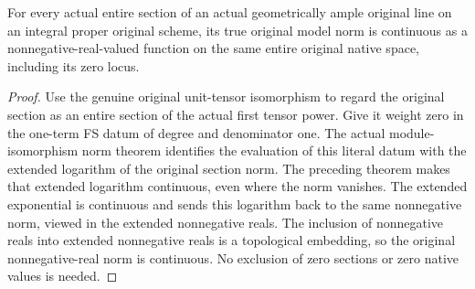 \begin{theorem}
\label{thm:native-ample-line-global-section-norm-continuous}
\leanok
{}
For every actual entire section of an actual geometrically ample original
line on an integral proper original scheme, its true original model norm
is continuous as a nonnegative-real-valued function on the same entire
original native space, including its zero locus.
\end{theorem}
\begin{proof}
Use the genuine original unit-tensor isomorphism to regard the original
section as an entire section of the actual first tensor power. Give it
weight zero in the one-term FS datum of degree and denominator one.
The actual module-isomorphism norm theorem identifies the evaluation of
this literal datum with the extended logarithm of the original section
norm. The preceding theorem makes that extended logarithm continuous,
even where the norm vanishes. The extended exponential is continuous
and sends this logarithm back to the same nonnegative norm, viewed in
the extended nonnegative reals. The inclusion of nonnegative reals into
extended nonnegative reals is a topological embedding, so the original
nonnegative-real norm is continuous. No exclusion of zero sections or
zero native values is needed.
\end{proof}
